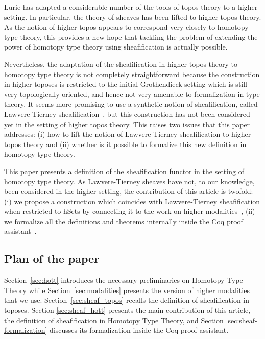 \documentclass[notfinal]{jfrarticle}
\begin{document}
Lurie has adapted a considerable number of the tools of topos theory
to a higher setting. In particular, the theory of sheaves has been
lifted to higher topos theory.
%
As the notion of higher topos appears to correspond very closely to
homotopy type theory, this provides a new hope that tackling the
problem of extending the power of homotopy type theory using
sheafification is actually possible.

Nevertheless, the adaptation of the sheafification in higher topos
theory to homotopy type theory is not completely straightforward because the
construction in higher toposes is restricted to the initial Grothendieck
setting which is still very topologically oriented, and hence not very
amenable to formalization in type theory. It seems more promising to
use a synthetic notion of sheafification, called Lawvere-Tierney
sheafification~\cite{tierney1972sheaf,maclanemoerdijk}, but this construction has not
been considered yet in the setting of higher topos theory. This raises
two issues that this paper addresses: (i) how to lift the notion of
Lawvere-Tierney sheafification to higher topos theory and (ii) whether is it
possible to formalize this new definition in homotopy type theory.



This paper presents a definition of the sheafification functor in the
setting of homotopy type theory. As Lawvere-Tierney sheaves have not, to
our knowledge, been considered in the higher setting, the contribution
of this article is twofold: (i) we propose a construction which
coincides with Lawvere-Tierney sheafification when restricted to hSets
by connecting it to the work on higher modalities~\cite{hottbook},
(ii) we formalize all the definitions and theorems internally inside
the Coq proof assistant~\cite{Coq:manual}.

\subsection*{Plan of the paper}

Section~\ref{sec:hott} introduces the necessary preliminaries on
Homotopy Type Theory while Section~\ref{sec:modalities} presents the
version of higher modalities that we
use. Section~\ref{sec:sheaf_topos} recalls the definition of
sheafification in toposes. Section \ref{sec:sheaf_hott} presents the
main contribution of this article, the definition of sheafification in
Homotopy Type Theory, and Section \ref{sec:sheaf-formalization}
discusses its formalization inside the Coq proof assistant. 
\end{document}
